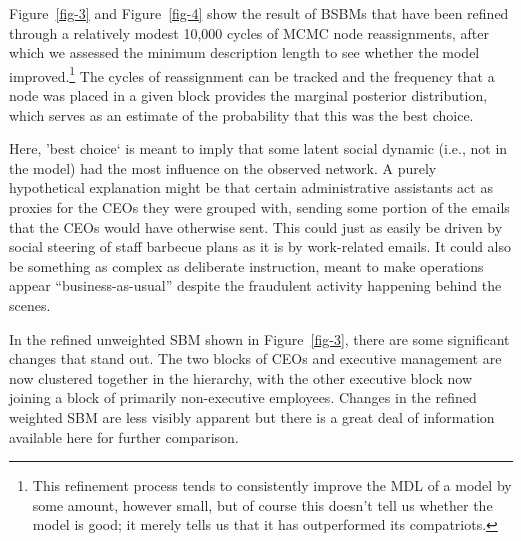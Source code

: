 \documentclass[
  12pt,
  a4paper,
  DIV=11,
  numbers=noendperiod,
  twoside,
  open=any]{scrartcl}
\begin{document}
Figure~\ref{fig-3} and Figure~\ref{fig-4} show the result of BSBMs that
have been refined through a relatively modest 10,000 cycles of MCMC node
reassignments, after which we assessed the minimum description length to
see whether the model improved.\footnote{This refinement process tends
  to consistently improve the MDL of a model by some amount, however
  small, but of course this doesn't tell us whether the model is good;
  it merely tells us that it has outperformed its compatriots.} The
cycles of reassignment can be tracked and the frequency that a node was
placed in a given block provides the marginal posterior distribution,
which serves as an estimate of the probability that this was the best
choice.

Here, 'best choice` is meant to imply that some latent social dynamic
(i.e., not in the model) had the most influence on the observed network.
A purely hypothetical explanation might be that certain administrative
assistants act as proxies for the CEOs they were grouped with, sending
some portion of the emails that the CEOs would have otherwise sent. This
could just as easily be driven by social steering of staff barbecue
plans as it is by work-related emails. It could also be something as
complex as deliberate instruction, meant to make operations appear
``business-as-usual'' despite the fraudulent activity happening behind
the scenes.

In the refined unweighted SBM shown in Figure~\ref{fig-3}, there are
some significant changes that stand out. The two blocks of CEOs and
executive management are now clustered together in the hierarchy, with
the other executive block now joining a block of primarily non-executive
employees. Changes in the refined weighted SBM are less visibly apparent
but there is a great deal of information available here for further
comparison.
\end{document}
